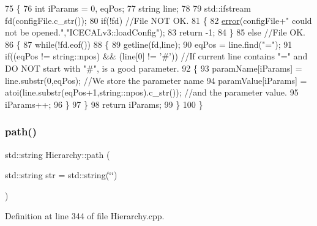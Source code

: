 \begin{DoxyCode}
75 \{
76     \textcolor{keywordtype}{int} iParams = 0, eqPos;
77     \textcolor{keywordtype}{string} line;    
78 
79     std::ifstream fd(configFile.c\_str());
80     \textcolor{keywordflow}{if}(!fd)                                 \textcolor{comment}{//File NOT OK.}
81     \{
82         \hyperlink{classObject_a204a95f57818c0f811933917a30eff45}{error}(configFile+\textcolor{stringliteral}{" could not be opened."},\textcolor{stringliteral}{"ICECALv3::loadConfig"});
83         \textcolor{keywordflow}{return} -1;
84   \}
85     \textcolor{keywordflow}{else}                                        \textcolor{comment}{//File OK.}
86     \{
87         \textcolor{keywordflow}{while}(!fd.eof())                                    
88         \{
89             getline(fd,line);
90             eqPos = line.find(\textcolor{stringliteral}{"="});
91             \textcolor{keywordflow}{if}((eqPos != string::npos) && (line[0] != \textcolor{charliteral}{'#'}))     \textcolor{comment}{//If current line contains "=" and DO NOT
       start with "#", is a good parameter.}
92             \{
93                 paramName[iParams]  = line.substr(0,eqPos);                                                         \textcolor{comment}{
      //We store the parameter name}
94                 paramValue[iParams] = atoi(line.substr(eqPos+1,string::npos).c\_str());  \textcolor{comment}{//and the parameter
       value.}
95                 iParams++;
96             \}
97         \}
98         \textcolor{keywordflow}{return} iParams;
99     \}
100 \}
\end{DoxyCode}
\mbox{\label{classHierarchy_aa7990fa7caf132d83e361ce033c6c65a}} 
\subsubsection{\texorpdfstring{path()}{path()}}
{\footnotesize\ttfamily std\+::string Hierarchy\+::path (\begin{DoxyParamCaption}\item[{std\+::string}]{str = {\ttfamily std\+:\+:string(\char`\"{}\char`\"{})} }\end{DoxyParamCaption})\hspace{0.3cm}{\ttfamily [inherited]}}



Definition at line 344 of file Hierarchy.\+cpp.



